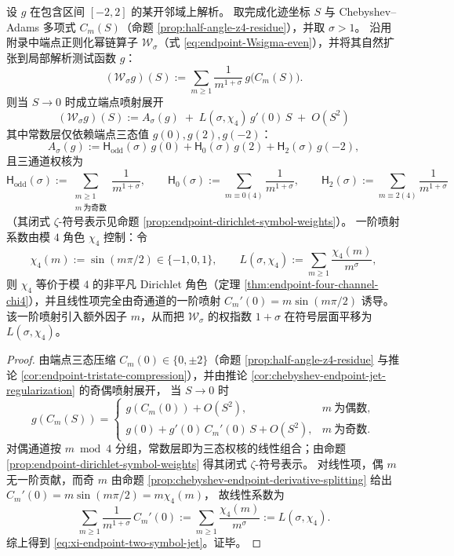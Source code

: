 \begin{theorem}\label{thm:xi-endpoint-two-symbol-jet}
设 \(g\) 在包含区间 \([-2,2]\) 的某开邻域上解析。
取完成化迹坐标 \(S\) 与 Chebyshev--Adams 多项式 \(C_m(S)\)（命题 \ref{prop:half-angle-z4-residue}），并取 \(\sigma>1\)。
沿用附录中端点正则化幂链算子 \(\mathcal W_\sigma\)（式 \eqref{eq:endpoint-Wsigma-even}），并将其自然扩张到局部解析测试函数 \(g\)：
\[
(\mathcal W_\sigma g)(S):=\sum_{m\ge 1}\frac{1}{m^{1+\sigma}}\,g\!\bigl(C_m(S)\bigr).
\]
则当 \(S\to 0\) 时成立端点喷射展开
\begin{equation}\label{eq:xi-endpoint-two-symbol-jet}
\boxed{\;
(\mathcal W_\sigma g)(S)
:=A_\sigma(g)\;+\;L(\sigma,\chi_4)\,g'(0)\,S\;+\;O(S^2)\;}
\end{equation}
其中常数层仅依赖端点三态值 \(g(0),g(2),g(-2)\)：
\[
A_\sigma(g):=\mathsf H_{\mathrm{odd}}(\sigma)\,g(0)+\mathsf H_{0}(\sigma)\,g(2)+\mathsf H_{2}(\sigma)\,g(-2),
\]
且三通道权核为
\[
\mathsf H_{\mathrm{odd}}(\sigma):=\sum_{\substack{m\ge 1\\ m\ \text{为奇数}}}\frac{1}{m^{1+\sigma}},\qquad
\mathsf H_{0}(\sigma):=\sum_{m\equiv 0(4)}\frac{1}{m^{1+\sigma}},\qquad
\mathsf H_{2}(\sigma):=\sum_{m\equiv 2(4)}\frac{1}{m^{1+\sigma}}
\]
（其闭式 \(\zeta\)-符号表示见命题 \ref{prop:endpoint-dirichlet-symbol-weights}）。
一阶喷射系数由模 \(4\) 角色 \(\chi_4\) 控制：令
\[
\chi_4(m):=\sin(m\pi/2)\in\{-1,0,1\},
\qquad
L(\sigma,\chi_4):=\sum_{m\ge 1}\frac{\chi_4(m)}{m^\sigma},
\]
则 \(\chi_4\) 等价于模 \(4\) 的非平凡 Dirichlet 角色（定理 \ref{thm:endpoint-four-channel-chi4}），并且线性项完全由奇通道的一阶喷射 \(C_m'(0)=m\sin(m\pi/2)\) 诱导。
该一阶喷射引入额外因子 \(m\)，从而把 \(\mathcal W_\sigma\) 的权指数 \(1+\sigma\) 在符号层面平移为 \(L(\sigma,\chi_4)\)。
\end{theorem}

\begin{proof}
由端点三态压缩 \(C_m(0)\in\{0,\pm 2\}\)（命题 \ref{prop:half-angle-z4-residue} 与推论 \ref{cor:endpoint-tristate-compression}），并由推论 \ref{cor:chebyshev-endpoint-jet-regularization} 的奇偶喷射展开，
当 \(S\to 0\) 时
\[
g(C_m(S))=
\begin{cases}
g(C_m(0))+O(S^2), & m\ \text{为偶数},\\
g(0)+g'(0)\,C_m'(0)\,S+O(S^2), & m\ \text{为奇数}.
\end{cases}
\]
对偶通道按 \(m\bmod 4\) 分组，常数层即为三态权核的线性组合；由命题 \ref{prop:endpoint-dirichlet-symbol-weights} 得其闭式 \(\zeta\)-符号表示。
对线性项，偶 \(m\) 无一阶贡献，而奇 \(m\) 由命题 \ref{prop:chebyshev-endpoint-derivative-splitting} 给出
\(
C_m'(0)=m\sin(m\pi/2)=m\chi_4(m)
\)，
故线性系数为
\[
\sum_{m\ge 1}\frac{1}{m^{1+\sigma}}\,C_m'(0)
:=\sum_{m\ge 1}\frac{\chi_4(m)}{m^\sigma}
:=L(\sigma,\chi_4).
\]
综上得到 \eqref{eq:xi-endpoint-two-symbol-jet}。证毕。
\end{proof}

